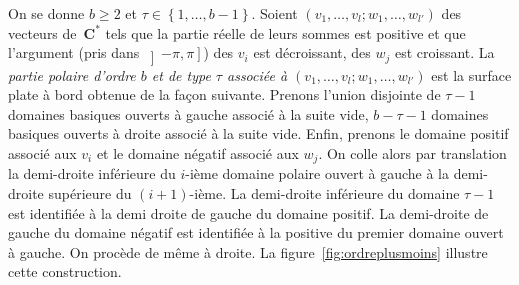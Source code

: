 \documentclass[JEP,XML,SOM,Unicode,francais,NoFloatCountersInSection,published]{cedram}
\newcommand{\CC}{\mathbf{C}}
\theoremstyle{definition}
\begin{document}
On se donne $b\geq2$ et $\tau\in\left\{1,\dots,b-1\right\}$.
Soient $(v_{1},\dots,v_{l};w_{1},\dots,w_{l'})$ des vecteurs de~$\CC^{\ast}$ tels que la partie réelle de leurs sommes est positive et que l'argument (pris dans $\left]-\pi,\pi\right]$) des $v_{i}$ est décroissant, des $w_{j}$ est croissant.
La \emph{partie polaire d'ordre $b$ et de type $\tau$ associée à $(v_{1},\dots,v_{l};w_{1},\dots,w_{l'})$} est la surface plate à bord obtenue de la façon suivante. Prenons l'union disjointe de $\tau-1$ domaines basiques ouverts à gauche associé à la suite vide, $b-\tau-1$ domaines basiques ouverts à droite associé à la suite vide. Enfin, prenons le domaine positif associé aux $v_{i}$ et le domaine négatif associé aux $w_{j}$. On colle alors par translation la demi-droite inférieure du $i$-ième domaine polaire ouvert à gauche à la demi-droite supérieure du $(i+1)$-ième. La demi-droite inférieure du domaine $\tau-1$ est identifiée à la demi droite de gauche du domaine positif. La demi-droite de gauche du domaine négatif est identifiée à la positive du premier domaine ouvert à gauche. On procède de même à droite. La figure~\ref{fig:ordreplusmoins} illustre cette construction.
\end{document}
